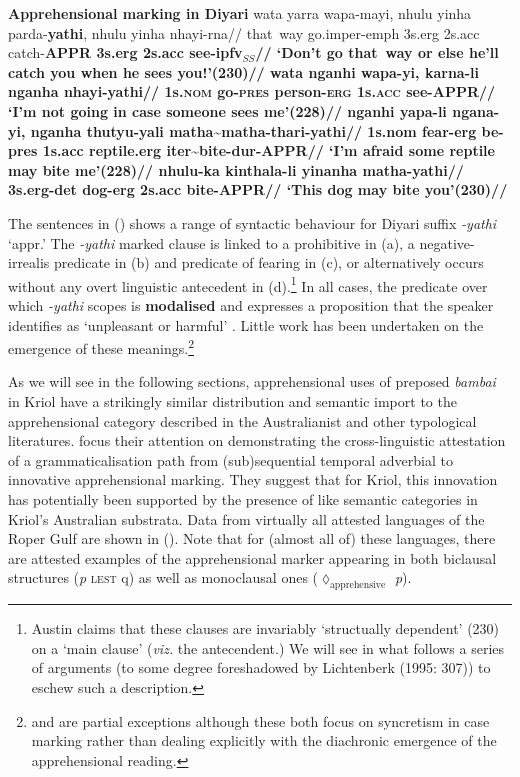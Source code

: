 \documentclass[11pt]{article}
\newcommand{\glem}[1]
{\MakeUppercase{\scriptsize{\textbf{#1}}}}
\begin{document}
\pex\textbf{Apprehensional marking in Diyari}\a\begingl
\gla wata yarra wapa-mayi, nhulu yinha parda-\textbf{yathi}, nhulu yinha nhayi-rna//
 that~way go.{\sc imper-emph} 3s{\sc.erg} 2s{\sc.acc} catch-\bfseries{{\footnotesize APPR}} 3s{\sc.erg} 2s{\sc.acc} see-{\sc ipfv$_{SS}$}//
\glft `Don't go that~way or else he'll catch you when he sees you!'\hfill(230)//
\endgl
\a\begingl
\gla wata nganhi wapa-yi, karna-li nganha nhayi-\textbf{yathi}//
 1s\textsc{.nom} go\textsc{-pres} person-\textsc{erg} 1s\textsc{.acc} see-{\glem{appr}}//
\glft ‘I’m not going in case someone sees me’\hfill(228)//
\endgl
\a\begingl
\gla nganhi yapa-li ngana-yi, nganha thutyu-yali matha\textasciitilde{}matha-thari-\textbf{yathi}//
\glb 1s{\sc.nom} fear{\sc-erg} be{\sc-pres} 1s{\sc.acc} reptile{\sc.erg} {\sc iter}\textasciitilde{}bite-{\sc dur-\glem{appr}}//
\glft `I'm afraid some reptile may bite me'\hfill(228)//\endgl
\a\begingl
\gla nhulu-ka kinthala-li yinanha matha-\textbf{yathi}//
\glb 3s.{\sc erg-det} dog{\sc-erg} 2s{\sc.acc} bite\glem{-appr}//
\glft `This dog may bite you'\hfill(230)//
\endgl
\xe

The sentences in (\lastx) shows a range of syntactic behaviour for Diyari suffix \textit{-yathi} `{\sc appr}.' The \textit{-yathi} marked clause is linked to a prohibitive in (a), a negative-irrealis predicate in (b) and predicate of fearing in (c), or alternatively occurs without any overt linguistic antecedent in (d).\footnote{Austin claims that these clauses are invariably `structually dependent' (230) on a `main clause' (\textit{viz.} the antecendent.) We will see in what follows a series of arguments (to some degree foreshadowed by Lichtenberk (1995: 307)) to eschew such a description.} In all cases, the predicate over which \textit{-yathi} scopes is \textbf{modalised} and expresses a proposition that the speaker identifies as `unpleasant or harmful' \citep[227]{Austin}. Little work has been undertaken on the emergence of these meanings.\footnote{\citet[171]{Dixon2002a} and \citet[44]{Blake1993} are partial exceptions although these both focus on syncretism in case marking rather than dealing explicitly with the diachronic emergence of the apprehensional reading.}

As we will see in the following sections, apprehensional uses of preposed \textit{bambai} in Kriol have a strikingly similar distribution and semantic import to the apprehensional category described in the Australianist and other typological literatures. \citet{Angelo2016} focus their attention on demonstrating the cross-linguistic attestation of a grammaticalisation path from (sub)sequential temporal adverbial to innovative apprehensional marking. They suggest that for Kriol, this innovation has potentially been supported by the presence of like semantic categories in Kriol's Australian substrata. Data from virtually all attested languages of the Roper Gulf are shown in (\nextx). Note that for (almost all of) these languages, there are attested examples of the apprehensional marker appearing in both biclausal structures (\textit{p} \textsc{lest} q) as well as monoclausal ones (\textit{$\lozenge_{\text{apprehensive}}$ p}).
\end{document}
